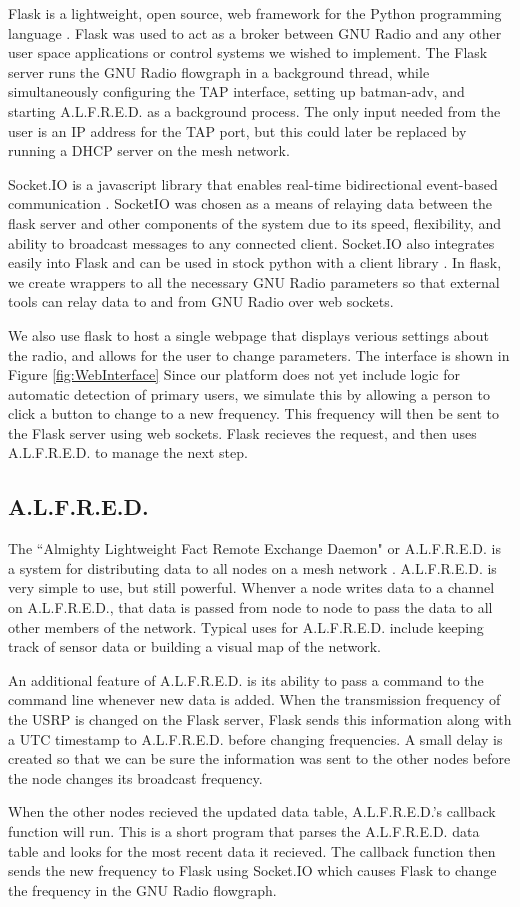 Flask is a lightweight, open source, web framework for the Python programming language \cite{0011}. Flask was used to act as a broker between GNU Radio and any other user space applications or control systems we wished to implement. The Flask server runs the GNU Radio flowgraph in a background thread, while simultaneously configuring the TAP interface, setting up batman-adv, and starting A.L.F.R.E.D. as a background process. The only input needed from the user is an IP address for the TAP port, but this could later be replaced by running a DHCP server on the mesh network. 

Socket.IO is a javascript library that enables real-time bidirectional event-based communication \cite{0012}.  SocketIO was chosen as a means of relaying data between the flask server and other components of the system due to its speed, flexibility, and ability to broadcast messages to any connected client. Socket.IO also integrates easily into Flask \cite{0013} and can be used in stock python with a client library \cite{0014}. In flask, we create wrappers to all the necessary GNU Radio parameters so that external tools can relay data to and from GNU Radio over web sockets.  

We also use flask to host a single webpage that displays verious settings about the radio, and allows for the user to change parameters. The interface is shown in Figure \ref{fig:WebInterface} Since our platform does not yet include logic for automatic detection of primary users, we simulate this by allowing a person to click a button to change to a new frequency. This frequency will then be sent to the Flask server using web sockets. Flask recieves the request, and then uses A.L.F.R.E.D. to manage the next step. 

\subsection{A.L.F.R.E.D.}

 The ``Almighty Lightweight Fact Remote Exchange Daemon" or A.L.F.R.E.D. is a system for distributing data to all nodes on a mesh network \cite{0015}. A.L.F.R.E.D. is very simple to use, but still powerful. Whenver a node writes data to a channel on A.L.F.R.E.D., that data is passed from node to node to pass the data to all other members of the network. Typical uses for A.L.F.R.E.D. include keeping track of sensor data or building a visual map of the network. 

 An additional feature of A.L.F.R.E.D. is its ability to pass a command to the command line whenever new data is added. When the transmission frequency of the USRP is changed on the Flask server, Flask sends this information along with a UTC timestamp to A.L.F.R.E.D. before changing frequencies. A small delay is created so that we can be sure the information was sent to the other nodes before the node changes its broadcast frequency.  

 When the other nodes recieved the updated data table, A.L.F.R.E.D.'s callback function will run. This is a short program that parses the A.L.F.R.E.D. data table and looks for the most recent data it recieved. The callback function then sends the new frequency to Flask using Socket.IO which causes Flask to change the frequency in the GNU Radio flowgraph.   